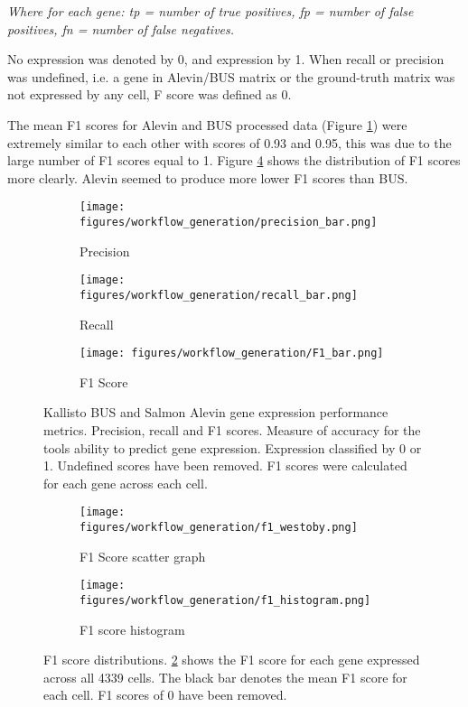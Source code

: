\textit{Where for each gene: tp = number of true positives, fp = number of false positives, fn = number of false negatives.}


No expression was denoted by 0, and expression by 1.
When recall or precision was undefined, i.e. a gene in Alevin/BUS matrix or the ground-truth matrix was not expressed by any cell, F score was defined as 0.

The mean F1 scores for Alevin and BUS processed data (Figure \ref{fig:precision_recall_f1_bar}) were extremely similar to each other with scores of 0.93 and 0.95, this was due to the large number of F1 scores equal to 1.
Figure \ref{fig:westoby_histogram} shows the distribution of F1 scores more clearly.
Alevin seemed to produce more lower F1 scores than BUS\@.

\begin{figure}[h]
\centering
\begin{subfigure}{0.32\textwidth}
    \texttt{[image: figures/workflow\_generation/precision\_bar.png]}
    \caption{Precision}
\end{subfigure}
\begin{subfigure}{0.32\textwidth}
    \texttt{[image: figures/workflow\_generation/recall\_bar.png]}
    \caption{Recall}
\end{subfigure}
\begin{subfigure}{0.32\textwidth}
    \centering
    \texttt{[image: figures/workflow\_generation/F1\_bar.png]}
    \caption{F1 Score}
\end{subfigure}
\caption[Kallisto BUS and Salmon Alevin gene expression performance metrics]{Kallisto BUS and Salmon Alevin gene expression performance metrics. Precision, recall and F1 scores.
Measure of accuracy for the tools ability to predict gene expression.
Expression classified by 0 or 1.
Undefined scores have been removed.
F1 scores were calculated for each gene across each cell.}
\label{fig:precision_recall_f1_bar}
\end{figure}
%
\begin{figure}[h]
\begin{subfigure}{0.5\textwidth}
    \texttt{[image: figures/workflow\_generation/f1\_westoby.png]}
    \caption{F1 Score scatter graph}
    \label{fig:f1_westoby}
\end{subfigure}
\begin{subfigure}{0.5\textwidth}
    \texttt{[image: figures/workflow\_generation/f1\_histogram.png]}
    \caption{F1 score histogram}
    \label{fig:f1_hist}
\end{subfigure}
\caption[Distribution of F1 scores]{F1 score distributions.
    \ref{fig:f1_westoby} shows the F1 score for each gene expressed across all 4339 cells.
    The black bar denotes the mean F1 score for each cell.
    F1 scores of 0 have been removed.}
\label{fig:westoby_histogram}
\end{figure}

